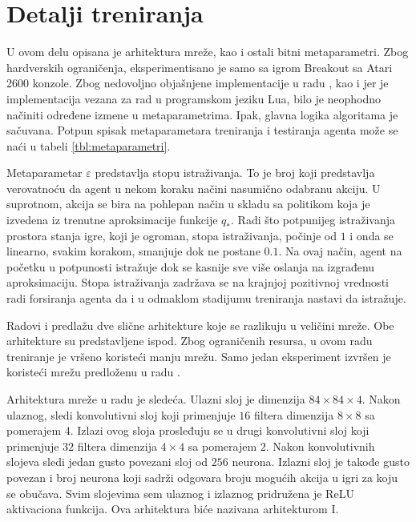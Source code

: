 \section{Detalji treniranja}
\label{sec:treniranje}
U ovom delu opisana je arhitektura mreže, kao i ostali bitni metaparametri. Zbog hardverskih ograničenja, eksperimentisano je samo sa igrom Breakout sa Atari 2600 konzole. Zbog nedovoljno objašnjene implementacije u radu \cite{dqn_mnih}, kao i jer je implementacija vezana za rad \cite{dqn_dm} u programskom jeziku Lua, bilo je neophodno načiniti određene izmene u metaparametrima. Ipak, glavna logika algoritama je sačuvana. Potpun spisak metaparametara treniranja i testiranja agenta može se naći u tabeli \ref{tbl:metaparametri}.
\par 
Metaparametar $\varepsilon$ predstavlja stopu istraživanja. To je broj koji predstavlja verovatnoću da agent u nekom koraku načini nasumično odabranu akciju. U suprotnom, akcija se bira na pohlepan način u skladu sa politikom koja je izvedena iz trenutne aproksimacije funkcije $q_*$. Radi što potpunijeg istraživanja prostora stanja igre, koji je ogroman, stopa istraživanja, počinje od $1$ i onda se linearno, svakim korakom, smanjuje dok ne postane $0.1$. Na ovaj način, agent na početku u potpunosti istražuje dok se kasnije sve više oslanja na izgrađenu aproksimaciju. Stopa istraživanja zadržava se na krajnjoj pozitivnoj vrednosti radi forsiranja agenta da i u odmaklom stadijumu treniranja nastavi da istražuje.
\par 
Radovi  \cite{dqn_mnih} i \cite{dqn_dm} predlažu dve slične arhitekture koje se razlikuju u veličini mreže. Obe arhitekture su predstavljene ispod. Zbog ograničenih resursa, u ovom radu treniranje je vršeno koristeći manju mrežu. Samo jedan eksperiment izvršen je koristeći mrežu predloženu u radu \cite{dqn_dm}.
\par 
Arhitektura mreže u radu \cite{dqn_mnih} je sledeća. Ulazni sloj je dimenzija $84 \times 84 \times 4$. Nakon ulaznog, sledi konvolutivni sloj koji primenjuje $16$ filtera dimenzija $8 \times 8$ sa pomerajem $4$. Izlazi ovog sloja prosleđuju se u drugi konvolutivni sloj koji primenjuje $32$ filtera dimenzija $4 \times 4$ sa pomerajem $2$. Nakon konvolutivnih slojeva sledi jedan gusto povezani sloj od $256$ neurona. Izlazni sloj je takođe gusto povezan i broj neurona koji sadrži odgovara broju mogućih akcija u igri za koju se obučava. Svim slojevima sem ulaznog i izlaznog pridružena je ReLU aktivaciona funkcija. Ova arhitektura biće nazivana arhitekturom I.
\par 
